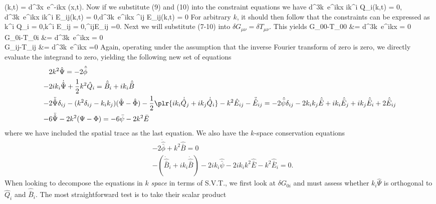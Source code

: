 \documentclass[10pt,letterpaper]{article}
\begin{document}
\be
	\hat \Psi(k,t) = \int d^3x\ e^{-ikx} \Psi(x,t).
\ee
Now if we substitute (9) and (10) into the constraint equations we have
\be
	\int d^3k\  e^{ikx} ik^i \hat Q_i(k,t) = 0, \qquad \int d^3k\  e^{ikx} ik^i \hat E_{ij}(k,t) = 0,\qquad \int d^3k\  e^{ikx} \delta^{ij} \hat E_{ij}(k,t) = 0
\ee
For arbitrary $k$, it should then follow that the constraints can be expressed as
\be
	k^i \hat Q_i = 0,\qquad k^i \hat E_{ij} = 0,\qquad \delta^{ij}\hat E_{ij} =0.
\ee
Next we will substitute (7-10) into $\delta G_{\mu\nu} = \delta T_{\mu\nu}$. This yields
\ba
	\delta G_{00}-\delta T_{00} &= \int d^3k\ e^{ikx}  = 0\\
	\delta G_{0i}-\delta T_{0i} &= \int d^3k\ e^{ikx}  = 0\\
	\delta G_{ij}-\delta T_{ij} &= \int d^3k\ e^{ikx} =0
\ea
Again, operating under the assumption that the inverse Fourier transform of zero is zero, we directly evaluate the integrand to zero, yielding the following new set of equations
\begin{align}
	&2k^2 \hat \Psi = -2\hat{\bar \phi} \\
	 -&2 ik_i \dot{\hat  \Psi} +\frac12 k^2 \hat Q_i= \hat{\bar B}_i+ik_i \hat{\bar B}\\
	  -&2 \ddot{\hat \Psi} \delta_{ij} - (k^2 \delta_{ij} - k_ik_j)(\hat \Psi - \hat \Phi)
	-\frac12\plr{ ik_i \dot{\hat Q}_j + ik_j \dot{\hat {Q}}_i} - k^2 \hat E_{ij} - \ddot {\hat{E}}_{ij}=-2\hat{\bar \psi}\delta_{ij} - 2k_ik_j \hat{\bar E} + ik_i \hat{\bar E}_j + ik_j \hat{\bar E}_i + 2\hat{\bar E}_{ij}\\
 -&6\ddot{\hat \Psi} - 2k^2(\Psi-\Phi) = -6\bar\psi - 2k^2\bar E
\end{align}
where we have included the spatial trace as the last equation. We also have the $k$-space conservation equations
\begin{align}
	&-2\dot{\hat{\bar{\phi}}} + k^2 \hat{\bar B} = 0\\
&-(\dot{\hat{\bar{B}}}_i + ik_i \dot{\hat{\bar B}}) - 2ik_i \hat{\bar\psi} - 2ik_ik^2\hat{\bar E} - k^2 \hat{\bar{E}}_i = 0.
\end{align}
When looking to decompose the equations in $k$ \emph{space} in terms of S.V.T., we first look at $\delta G_{0i}$ and must assess whether $k_i \hat \Psi$ is orthogonal to $\hat Q_i$ and $\hat{\bar B}_i$. The most straightforward test is to take their scalar product
\end{document}
